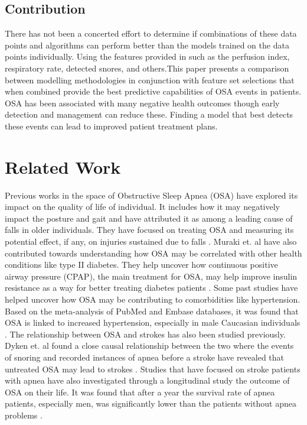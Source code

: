 \documentclass[acmsmall]{acmart}
\begin{document}
\subsection{Contribution}
There has not been a concerted effort to determine if combinations of these data points and algorithms can perform better than the models trained on the data points individually. Using the features provided in \cite{bernardini2022osasud} such as the perfusion index, respiratory rate, detected snores, and others.This paper presents a comparison between modelling methodologies in conjunction with feature set selections that when combined provide the best predictive capabilities of OSA events in patients. OSA has been associated with many negative health outcomes though early detection and management can reduce these. Finding a model that best detects these events can lead to improved patient treatment plans.

\section{Related Work}
Previous works in the space of Obstructive Sleep Apnea (OSA) have explored its impact on the quality of life of individual. It includes how it may negatively impact the posture and gait and have attributed it as among a leading cause of falls in older individuals. They have focused on treating OSA and measuring its potential effect, if any, on injuries sustained due to falls \cite{stevens2020impact}. Muraki et. al have also contributed towards understanding how OSA may be correlated with other health conditions like type II diabetes. They help uncover how continuous positive airway pressure (CPAP), the main treatment for OSA, may help improve insulin resistance as a way for better treating diabetes patients \cite{muraki2018sleep}. Some past studies have helped uncover how OSA may be contributing to comorbidities like hypertension. Based on the meta-analysis of PubMed and Embase databases, it was found that OSA is linked to increased hypertension, especially in male Caucasian individuals \cite{hou2018association}. The relationship between OSA and strokes has also been studied previously. Dyken et. al found a close causal relationship between the two where the events of snoring and recorded instances of apnea before a stroke have revealed that untreated OSA may lead to strokes \cite{dyken2009obstructive,silverberg2002treating}. Studies that have focused on stroke patients with apnea have also investigated through a longitudinal study the outcome of OSA on their life. It was found that after a year the survival rate of apnea patients, especially men, was significantly lower than the patients without apnea problems \cite{kojic2021does}.
 
\end{document}
